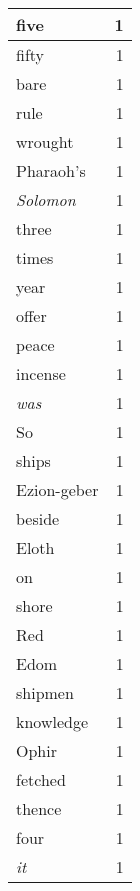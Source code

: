 \begin{center}
\begin{longtable}{l|r}
five & 1 \\ \hline
fifty & 1 \\ \hline
bare & 1 \\ \hline
rule & 1 \\ \hline
wrought & 1 \\ \hline
Pharaoh's & 1 \\ \hline
\emph{Solomon} & 1 \\ \hline
three & 1 \\ \hline
times & 1 \\ \hline
year & 1 \\ \hline
offer & 1 \\ \hline
peace & 1 \\ \hline
incense & 1 \\ \hline
\emph{was} & 1 \\ \hline
So & 1 \\ \hline
ships & 1 \\ \hline
Ezion-geber & 1 \\ \hline
beside & 1 \\ \hline
Eloth & 1 \\ \hline
on & 1 \\ \hline
shore & 1 \\ \hline
Red & 1 \\ \hline
Edom & 1 \\ \hline
shipmen & 1 \\ \hline
knowledge & 1 \\ \hline
Ophir & 1 \\ \hline
fetched & 1 \\ \hline
thence & 1 \\ \hline
four & 1 \\ \hline
\emph{it} & 1 \\ \hline
\end{longtable}
\end{center}



\normalsize



